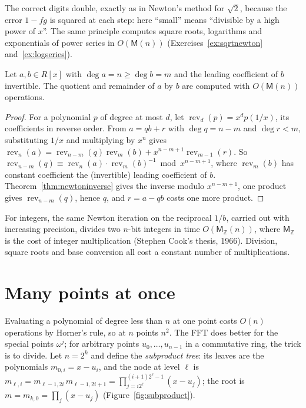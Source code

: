 The correct digits double, exactly as in Newton's method for $\sqrt2$, because the error $1-fg$ is squared at each step: here ``small'' means ``divisible by a high power of $x$''. The same principle computes square roots, logarithms and exponentials of power series in $O(\mathsf M(n))$ (Exercises~\ref{ex:sqrtnewton} and~\ref{ex:logseries}).

\begin{corollary}\label{cor:fastdiv}
Let $a,b\in R[x]$ with $\deg a=n\ge\deg b=m$ and the leading coefficient of $b$ invertible. The quotient and remainder of $a$ by $b$ are computed with $O(\mathsf M(n))$ operations.
\end{corollary}
\begin{proof}
For a polynomial $p$ of degree at most $d$, let $\operatorname{rev}_d(p)=x^dp(1/x)$, its coefficients in reverse order. From $a=qb+r$ with $\deg q=n-m$ and $\deg r<m$, substituting $1/x$ and multiplying by $x^n$ gives $\operatorname{rev}_n(a)=\operatorname{rev}_{n-m}(q)\operatorname{rev}_m(b)+x^{n-m+1}\operatorname{rev}_{m-1}(r)$. So
$\operatorname{rev}_{n-m}(q)\equiv\operatorname{rev}_n(a)\cdot\operatorname{rev}_m(b)^{-1}\bmod x^{n-m+1}$, where $\operatorname{rev}_m(b)$ has constant coefficient the (invertible) leading coefficient of $b$. Theorem~\ref{thm:newtoninverse} gives the inverse modulo $x^{n-m+1}$, one product gives $\operatorname{rev}_{n-m}(q)$, hence $q$, and $r=a-qb$ costs one more product.
\end{proof}

For integers, the same Newton iteration on the reciprocal $1/b$, carried out with increasing precision, divides two $n$-bit integers in time $O(\mathsf M_{\mathbb Z}(n))$, where $\mathsf M_{\mathbb Z}$ is the cost of integer multiplication (Stephen Cook's thesis, 1966). Division, square roots and base conversion all cost a constant number of multiplications.

\section{Many points at once}\label{sec:multipoint}

Evaluating a polynomial of degree less than $n$ at one point costs $O(n)$ operations by Horner's rule, so at $n$ points $n^2$. The FFT does better for the special points $\omega^j$; for arbitrary points $u_0,\dots,u_{n-1}$ in a commutative ring, the trick is to divide. Let $n=2^k$ and define the \emph{subproduct tree}: its leaves are the
polynomials $m_{0,i}=x-u_i$, and the node at level $\ell$ is $m_{\ell,i}=m_{\ell-1,2i}\,m_{\ell-1,2i+1}=\prod_{j=i2^\ell}^{(i+1)2^\ell-1}(x-u_j)$; the root is $m=m_{k,0}=\prod_j(x-u_j)$ (Figure~\ref{fig:subproduct}).

